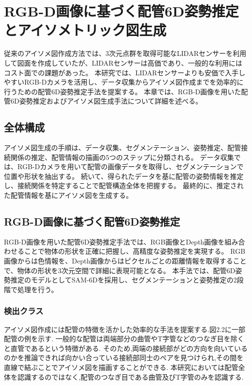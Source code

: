 \chapter{RGB-D画像に基づく配管6D姿勢推定とアイソメトリック図生成}
従来のアイソメ図作成方法では、3次元点群を取得可能なLIDARセンサーを利用して図面を作成していたが、LIDARセンサーは高価であり、一般的な利用にはコスト面での課題があった。
本研究では、LIDARセンサーよりも安価で入手しやすいRGB-Dカメラを活用し、データ収集からアイソメ図作成までを効率的に行うための配管6D姿勢推定手法を提案する。
本章では、RGB-D画像を用いた配管6D姿勢推定およびアイソメ図生成手法について詳細を述べる。


\section{全体構成}
アイソメ図生成の手順は、データ収集、セグメンテーション、姿勢推定、配管接続関係の推定、配管情報の描画の5つのステップに分類される。
データ収集では、RGB-Dカメラを用いて配管の画像データを取得し、セグメンテーションで位置や形状を抽出する。
続いて、得られたデータを基に配管の姿勢情報を推定し、接続関係を特定することで配管構造全体を把握する。
最終的に、推定された配管情報を基にアイソメ図を生成する。


\section{RGB-D画像に基づく配管6D姿勢推定}
RGB-D画像を用いた配管6D姿勢推定手法では、RGB画像とDepth画像を組み合わせることで物体の形状を正確に把握し、高精度な姿勢推定を実現する。
RGB画像からは色情報を、Depth画像からはピクセルごとの距離情報を取得することで、物体の形状を3次元空間で詳細に表現可能となる。
本手法では、配管6D姿勢推定のモデルとしてSAM-6Dを採用し、セグメンテーションと姿勢推定の2段階で処理を行う。

\subsection{検出クラス}
アイソメ図作成には配管の特徴を活かした効率的な手法を提案する.図2.2に一部配管の例を示す.
一般的な配管は両端部分の曲管やT字管などのつなぎ目を除くと直管であるという特徴がある.
そのため,両端の接続部がどの方向を向いているのかを推論できれば向かい合っている接続部同士のペアを見つけられ,その間を直線で結ぶことでアイソメ図を描画することができる.
本研究においては配管全体を認識するのではなく,配管のつなぎ目である曲管及びT字管のみを認識する.

